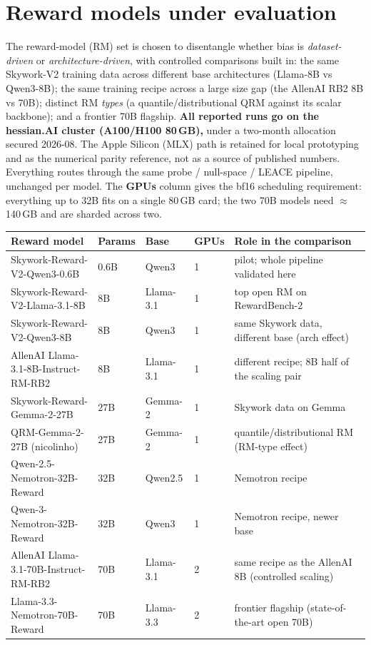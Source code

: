 \documentclass{article}
\begin{document}
\section{Reward models under evaluation}
The reward-model (RM) set is chosen to disentangle whether bias is \emph{dataset-driven} or
\emph{architecture-driven}, with controlled comparisons built in: the same Skywork-V2 training data across
different base architectures (Llama-8B vs Qwen3-8B); the same training recipe across a large size gap (the
AllenAI RB2 8B vs 70B); distinct RM \emph{types} (a quantile/distributional QRM against its scalar backbone);
and a frontier 70B flagship. \textbf{All reported runs go on the hessian.AI cluster (A100/H100 80\,GB),}
under a two-month allocation secured 2026-08. The Apple Silicon (MLX) path is retained for local prototyping
and as the numerical parity reference, not as a source of published numbers.  Everything routes through the
same probe / null-space / LEACE pipeline, unchanged per model. The \textbf{GPUs} column gives the bf16
scheduling requirement: everything up to 32B fits on a single 80\,GB card; the two 70B models need
$\approx$140\,GB and are sharded across two.
\begin{center}\footnotesize\setlength{\tabcolsep}{4pt}
\begin{tabular}{@{}llllp{4.1cm}@{}}
\hline
\textbf{Reward model} & \textbf{Params} & \textbf{Base} & \textbf{GPUs} & \textbf{Role in the comparison}\\
\hline
Skywork-Reward-V2-Qwen3-0.6B        & 0.6B & Qwen3   & 1 & pilot; whole pipeline validated here\\
Skywork-Reward-V2-Llama-3.1-8B      & 8B   & Llama-3.1 & 1 & top open RM on RewardBench-2\\
Skywork-Reward-V2-Qwen3-8B          & 8B   & Qwen3   & 1 & same Skywork data, different base (arch effect)\\
AllenAI Llama-3.1-8B-Instruct-RM-RB2& 8B   & Llama-3.1 & 1 & different recipe; 8B half of the scaling pair\\
Skywork-Reward-Gemma-2-27B          & 27B  & Gemma-2 & 1 & Skywork data on Gemma\\
QRM-Gemma-2-27B (nicolinho)         & 27B  & Gemma-2 & 1 & quantile/distributional RM (RM-type effect)\\
Qwen-2.5-Nemotron-32B-Reward        & 32B  & Qwen2.5 & 1 & Nemotron recipe\\
Qwen-3-Nemotron-32B-Reward          & 32B  & Qwen3   & 1 & Nemotron recipe, newer base\\
AllenAI Llama-3.1-70B-Instruct-RM-RB2& 70B & Llama-3.1 & 2 & same recipe as the AllenAI 8B (controlled scaling)\\
Llama-3.3-Nemotron-70B-Reward       & 70B  & Llama-3.3 & 2 & frontier flagship (state-of-the-art open 70B)\\
\hline
\end{tabular}
\end{center}
\end{document}
